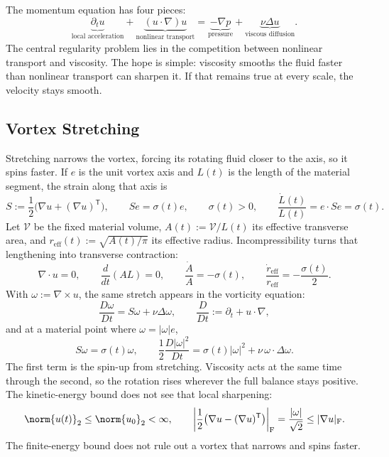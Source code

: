 
The momentum equation has four pieces:
\[
  \underbrace{\partial_t u}_{\text{local acceleration}}
  +
  \underbrace{(u\cdot\nabla)u}_{\text{nonlinear transport}}
  =
  \underbrace{-\nabla p}_{\text{pressure}}
  +
  \underbrace{\nu\Delta u}_{\text{viscous diffusion}}.
\]
The central regularity problem lies in the competition between nonlinear transport and viscosity.
The hope is simple: viscosity smooths the fluid faster than nonlinear transport can sharpen it.
If that remains true at every scale, the velocity stays smooth.

\subsection{Vortex Stretching}\label{sub:ThePerfectlyStretchingVortex}

Stretching narrows the vortex, forcing its rotating fluid closer to the axis, so it spins faster.
If \(e\) is the unit vortex axis and \(L(t)\) is the length of the material segment, the strain along that axis is
\[
  S:=\frac12\bigl(\nabla u+(\nabla u)^{\mathsf T}\bigr),
  \qquad
  Se=\sigma(t)e,
  \qquad
  \sigma(t)>0,
  \qquad
  \frac{\dot L(t)}{L(t)}
  =
  e\cdot Se
  =
  \sigma(t).
\]
Let \(\mathcal V\) be the fixed material volume, \(A(t):=\mathcal V/L(t)\) its effective transverse area, and \(r_{\mathrm{eff}}(t):=\sqrt{A(t)/\pi}\) its effective radius. Incompressibility turns that lengthening into transverse contraction:
\[
  \nabla\cdot u=0,
  \qquad
  \frac{d}{dt}(A L)=0,
  \qquad
  \frac{\dot A}{A}=-\sigma(t),
  \qquad
  \frac{\dot r_{\mathrm{eff}}}{r_{\mathrm{eff}}}
  =
  -\frac{\sigma(t)}{2}.
\]
With \(\omega:=\nabla\times u\), the same stretch appears in the vorticity equation:
\[
  \frac{D\omega}{Dt}
  =
  S\omega+\nu\Delta\omega,
  \qquad
  \frac{D}{Dt}
  :=
  \partial_t+u\cdot\nabla,
\]
and at a material point where \(\omega=|\omega|e\),
\[
  S\omega
  =
  \sigma(t)\omega,
  \qquad
  \frac12\frac{D|\omega|^2}{Dt}
  =
  \sigma(t)|\omega|^2
  +
  \nu\,\omega\cdot\Delta\omega.
\]
The first term is the spin-up from stretching. Viscosity acts at the same time through the second, so the rotation rises wherever the full balance stays positive.
The kinetic-energy bound does not see that local sharpening:
\[
  \norm{u(t)}_2
  \leq
  \norm{u_0}_2
  <\infty,
  \qquad
  \left|\frac12\bigl(\nabla u-(\nabla u)^{\mathsf T}\bigr)\right|_{\mathrm F}
  =
  \frac{|\omega|}{\sqrt2}
  \leq
  |\nabla u|_{\mathrm F}.
\]
The finite-energy bound does not rule out a vortex that narrows and spins faster.

